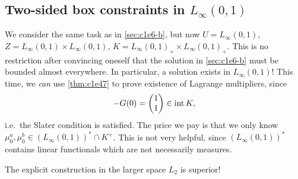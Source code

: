 \documentclass[../skript.tex]{subfiles}
\begin{document}
\subsection{Two-sided box constraints in \texorpdfstring{$L_\infty(0, 1)$}{L∞(0,1)}} %
\label{sec:c1e6-c}
We consider the same task as in \cref{sec:c1e6-b}, but now $U = L_\infty(0, 1)$, $Z = L_\infty(0, 1) \times L_\infty(0, 1)$, $K = L_\infty(0, 1)_+ \times L_\infty(0, 1)_+$.
This is no restriction after convincing oneself that the solution in \cref{sec:c1e6-b} must be bounded almost everywhere.
In particular, a solution exists in $L_\infty(0, 1)$!
This time, we \emph{can} use \cref{thm:c1e47} to prove existence of Lagrange multipliers, since
\[
	-G(0) = \begin{pmatrix}
	1 \\ 1
	\end{pmatrix} \in \operatorname{int} K,
\]
i.e.\ the Slater condition is satisfied.
The price we pay is that we only know $\mu_0^a, \mu_0^b \in (L_\infty(0, 1))^* \cap K^+$. This is not very helpful, since $(L_\infty(0, 1))^*$ contains linear functionals which are not necessarily measures.

The explicit construction in the larger space $L_2$ is superior!
\end{document}
